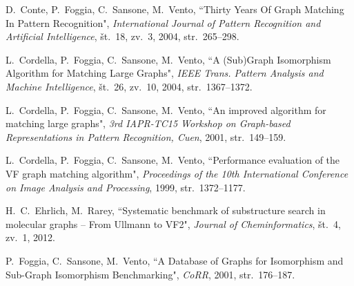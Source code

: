 \documentclass[a4paper, 12pt, ]{book}
\begin{document}
\begin{thebibliography}{99}



	 D.~Conte, P.~Foggia, C.~Sansone, M.~Vento, ``Thirty Years Of Graph Matching In Pattern Recognition",
		\textit{International Journal of Pattern Recognition and Artificial Intelligence}, št.~18, zv.~3, 2004, str.~265--298.

	 L.~Cordella, P.~Foggia, C.~Sansone, M.~Vento, ``A (Sub)Graph Isomorphism Algorithm for Matching Large Graphs",
		\textit {IEEE Trans. Pattern Analysis and Machine Intelligence}, št.~26, zv.~10, 2004, str.~1367--1372.
		
	 L.~Cordella, P.~Foggia, C.~Sansone, M.~Vento, ``An improved algorithm for matching large graphs",
		\textit {3rd IAPR-TC15 Workshop on Graph-based Representations in Pattern Recognition, Cuen}, 2001, str.~149--159.
		
	 L.~Cordella, P.~Foggia, C.~Sansone, M.~Vento, ``Performance evaluation of the VF graph matching algorithm",
		\textit {Proceedings of the 10th International Conference on Image Analysis and Processing}, 1999, str.~1372--1177.

	 H.~C.~Ehrlich, M.~Rarey, ``Systematic benchmark of substructure search in molecular graphs -- From Ullmann to VF2",
		\textit{Journal of Cheminformatics}, št.~4, zv.~1, 2012.

	 P.~Foggia, C.~Sansone, M.~Vento, ``A Database of Graphs for Isomorphism and Sub-Graph Isomorphism Benchmarking",
		\textit{CoRR}, 2001, str.~176--187.
		

\end{thebibliography}
\end{document}
